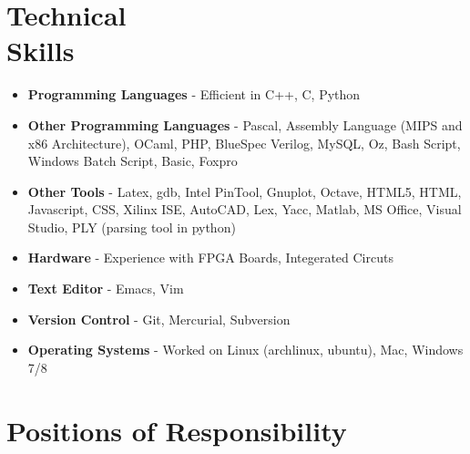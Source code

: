 \documentclass[margin,line]{resume}
\begin{document}
\begin{resume}
  \section{\mysidestyle Technical \\Skills}

  \begin{itemize}
  \item \textbf{\textsf{Programming Languages}} - Efficient in C++, C, Python
  \item \textbf{\textsf{Other Programming Languages}} - Pascal, Assembly Language (MIPS and x86 Architecture), OCaml, PHP, BlueSpec Verilog, MySQL, Oz, Bash Script, Windows Batch Script, Basic, Foxpro
  \item \textbf{\textsf{Other Tools}} - Latex, gdb, Intel PinTool, Gnuplot, Octave, HTML5, HTML, Javascript, CSS, Xilinx ISE, AutoCAD, Lex, Yacc, Matlab, MS Office, Visual Studio, PLY (parsing tool in python)
  \item \textbf{\textsf{Hardware}} - Experience with FPGA Boards, Integerated Circuts
  \item \textbf{\textsf{Text Editor}} - Emacs, Vim
  \item \textbf{\textsf{Version Control}} - Git, Mercurial, Subversion
  \item \textbf{\textsf{Operating Systems}} - Worked on Linux (archlinux, ubuntu), Mac, Windows 7/8
  \end{itemize}

  \section{\mysidestyle Positions of Responsibility}

  \begin{itemize}


\end{itemize}
\end{resume}
\end{document}
